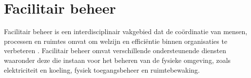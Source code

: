 %
%

%


\section{Facilitair beheer}
Facilitair beheer  is een interdisciplinair vakgebied dat de coördinatie van mensen, processen en ruimtes omvat om welzijn en efficiëntie binnen organisaties te verbeteren \autocite{jaouhari2023we}. Facilitair beheer omvat verschillende ondersteunende diensten waaronder deze die instaan voor het beheren van de fysieke omgeving, zoals elektriciteit en koeling, fysiek toegangsbeheer en ruimtebewaking.

